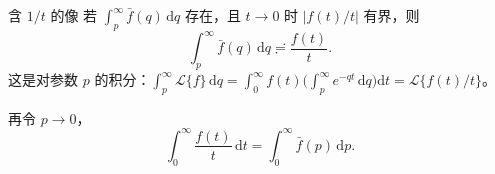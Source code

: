 \documentclass[fontset=windows, chinese, 10pt, xcolor=dvipsnames]{beamer}
\begin{document}


\begin{frame}{含 $1/t$ 的像}
  若 $\displaystyle\int_p^{\infty}\bar f(q)\,\mathrm{d}q$ 存在，且 $t\to 0$ 时 $|f(t)/t|$ 有界，则
  \begin{equation*}
    \int_p^{\infty}\bar f(q)\,\mathrm{d}q
    \risingdotseq\frac{f(t)}{t}.
  \end{equation*}
  这是对参数 $p$ 的积分：$\displaystyle\int_p^{\infty}\mathcal{L}\{f\}\,\mathrm{d}q
    =\int_0^{\infty} f(t)\bigl(\int_p^{\infty} e^{-qt}\,\mathrm{d}q\bigr)\mathrm{d}t
    =\mathcal{L}\{f(t)/t\}$。
  \vspace{0.3em}

  再令 $p\to 0$，
  \begin{equation*}
    \int_0^{\infty}\frac{f(t)}{t}\,\mathrm{d}t
    =\int_0^{\infty}\bar f(p)\,\mathrm{d}p.
  \end{equation*}
\end{frame}
\end{document}
